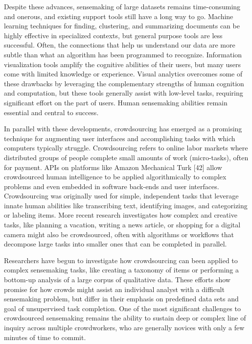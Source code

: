 \documentclass[journal]{vgtc}                %
\begin{document}
Despite these advances, sensemaking of large datasets remains time-consuming and onerous, and existing support tools still have a long way to go. Machine learning techniques for finding, clustering, and summarizing documents can be highly effective in specialized contexts, but general purpose tools are less successful. Often, the connections that help us understand our data are more subtle than what an algorithm has been programmed to recognize. Information visualization tools amplify the cognitive abilities of their users, but many users come with limited knowledge or experience. Visual analytics overcomes some of these drawbacks by leveraging the complementary strengths of human cognition and computation, but these tools generally assist with low-level tasks, requiring significant effort on the part of users. Human sensemaking abilities remain essential and central to success.

In parallel with these developments, crowdsourcing has emerged as a promising technique for augmenting user interfaces and accomplishing tasks with which computers typically struggle. Crowdsourcing refers to online labor markets where distributed groups of people complete small amounts of work (micro-tasks), often for payment. APIs on platforms like Amazon Mechanical Turk [42] allow crowdsourced human intelligence to be applied algorithmically to complex problems and even embedded in software back-ends and user interfaces. Crowdsourcing was originally used for simple, independent tasks that leverage innate human abilities like transcribing text, identifying images, and categorizing or labeling items. More recent research investigates how complex and creative tasks, like planning a vacation, writing a news article, or shopping for a digital camera might also be crowdsourced, often with algorithms or workflows that decompose large tasks into smaller ones that can be completed in parallel.

Researchers have begun to investigate how crowdsourcing can been applied to complex sensemaking tasks, like creating a taxonomy of items or performing a bottom-up analysis of a large corpus of qualitative data. These efforts show promise for how crowds might assist an individual analyst with a difficult sensemaking problem, but differ in their emphasis on predefined data sets and goal of unsupervised task completion. One of the most significant challenges to crowdsourced sensemaking remains the ability to sustain deep or complex line of inquiry across multiple crowdworkers, who are generally novices with only a few minutes of time to commit.
\end{document}
